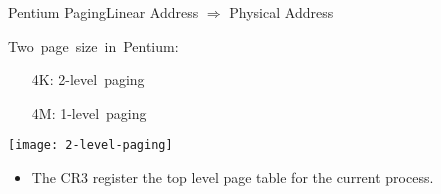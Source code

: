 
\begin{frame}{Pentium Paging}{Linear Address $\Rightarrow$ Physical Address}
  \begin{minipage}{.4\textwidth}
    \mbox{Two page size in Pentium:}
    \begin{small}
      \begin{itemize}
      \item[4K:] \mbox{2-level paging}%
      \item[4M:] \mbox{1-level paging}%
      \end{itemize}
    \end{small}
    \begin{center}
      \texttt{[image: 2-level-paging]}
    \end{center}
  \end{minipage}\quad
  \begin{minipage}{.5\textwidth}
    \begin{center}
    \end{center}
  \end{minipage}
\end{frame}

\begin{itemize}
\item The CR3 register {\pright} the top level page table for the current process.
\end{itemize}

